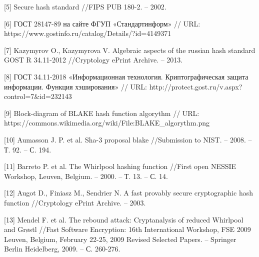 \documentclass[colorthm]{./civarticle}
\begin{document}
[5] Secure hash standard //FIPS PUB 180-2. – 2002.

[6] ГОСТ 28147-89 на сайте ФГУП «Стандартинформ» // URL: https://www.gostinfo.ru/catalog/Details/?id=4149371

[7] Kazymyrov O., Kazymyrova V. Algebraic aspects of the russian hash standard GOST R 34.11-2012 //Cryptology ePrint Archive. – 2013.

[8] ГОСТ 34.11-2018 «Информационная технология. Криптографическая защита информации. Функция хэширования» // URL: http://protect.gost.ru/v.aspx?control=7&id=232143

[9] Block-diagram of BLAKE hash function algorythm // URL: https://commons.wikimedia.org/wiki/File:BLAKE_algorythm.png

[10] Aumasson J. P. et al. Sha-3 proposal blake //Submission to NIST. – 2008. – Т. 92. – С. 194.

[11] Barreto P. et al. The Whirlpool hashing function //First open NESSIE Workshop, Leuven, Belgium. – 2000. – Т. 13. – С. 14.

[12] Augot D., Finiasz M., Sendrier N. A fast provably secure cryptographic hash function //Cryptology ePrint Archive. – 2003.

[13] Mendel F. et al. The rebound attack: Cryptanalysis of reduced Whirlpool and Grøstl //Fast Software Encryption: 16th International Workshop, FSE 2009 Leuven, Belgium, February 22-25, 2009 Revised Selected Papers. – Springer Berlin Heidelberg, 2009. – С. 260-276.
\end{document}
